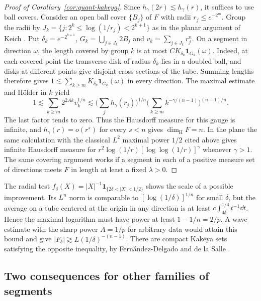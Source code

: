 \begin{proof}[Proof of Corollary~\ref{cor:quant-kakeya}]
Since \(h_\gamma(2r)\lesssim h_\gamma(r)\), it suffices to use ball
covers. Consider an open ball cover \(\{B_j\}\) of \(F\) with radii
\(r_j\le e^{-2^m}\). Group the radii by
\(J_k=\{j:2^k\le\log(1/r_j)<2^{k+1}\}\) as in the planar argument of
Keich \cite[Claim 3.2]{Keich1999}. Put
\(\delta_k=e^{-2^{k+1}}\), \(G_k=\bigcup_{j\in J_k}2B_j\) and
\(v_k=\sum_{j\in J_k}r_j^n\). On a segment in direction \(\omega\),
the length covered by group \(k\) is at most
\(C K_{\delta_k}\mathbf1_{G_k}(\omega)\). Indeed, at each covered
point the transverse disk of radius \(\delta_k\) lies in a doubled
ball, and disks at different points give disjoint cross sections of
the tube. Summing lengths therefore gives
\(1\lesssim\sum_{k\ge m}K_{\delta_k}\mathbf1_{G_k}(\omega)\) in
every direction. The maximal estimate and H\"older in \(k\) yield
\[
 1\lesssim\sum_{k\ge m}2^{2Ak}v_k^{1/n}
 \lesssim\Big(\sum_j h_\gamma(r_j)\Big)^{1/n}
              \Big(\sum_{k\ge m} k^{-\gamma/(n-1)}\Big)^{(n-1)/n}.
\]
The last factor tends to zero. Thus the Hausdorff measure for this
gauge is infinite, and \(h_\gamma(r)=o(r^s)\) for every \(s<n\)
gives \(\dim_{\mathrm H}F=n\). In the plane the same calculation with
the classical $L^2$ maximal power $1/2$ cited above gives infinite
Hausdorff measure for
$r^2\log(1/r)[\log\log(1/r)]^\gamma$ whenever $\gamma>1$.
The same covering argument works if a segment in
each of a positive measure set of directions meets \(F\) in length
at least a fixed \(\lambda>0\).
\end{proof}

The radial test \(f_\delta(X)=|X|^{-1}\mathbf1_{\{2\delta<|X|<1/2\}}\)
shows the scale of a possible improvement. Its \(L^n\) norm is
comparable to \([\log(1/\delta)]^{1/n}\) for small \(\delta\), but
the average on a tube centered at the origin in any direction is at
least \(c\int_{4\delta}^{1/4}t^{-1}\dd t\). Hence the maximal
logarithm must have power at least \(1-1/n=2/p\). A wave estimate
with the sharp power \(A=1/p\) for arbitrary data would attain this
bound and give \(|F_\delta|\gtrsim L(1/\delta)^{-(n-1)}\). There are
compact Kakeya sets satisfying the opposite inequality, by
Fern\'andez-Delgado and de la Salle
\cite[Theorem 1.3]{FernandezDelgadoDeLaSalle2026}.

\subsection{Two consequences for other families of segments}

